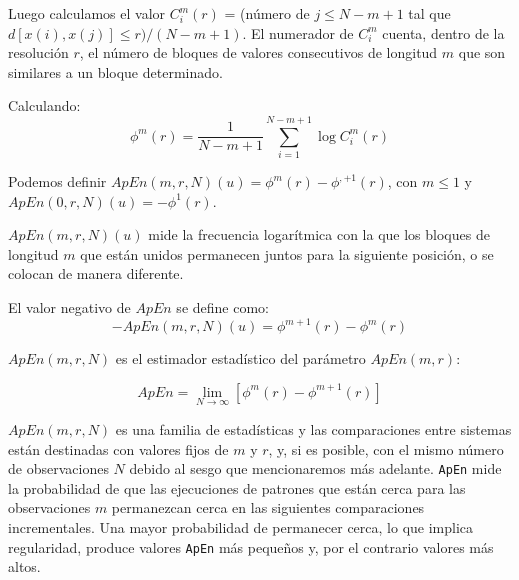 \documentclass[a4paper,12pt]{article}
\begin{document}
Luego calculamos el valor $C_i^m (r)$ = (número de $j \leq N - m + 1$ tal que $d[x(i), x(j)] \leq r)/(N - m + 1)$. El numerador de $C_i^m$ cuenta, dentro de la resolución $r$, el número de bloques de valores consecutivos de longitud $m$ que son similares a un bloque determinado. 

Calculando: 
$$\phi^m(r) = \frac{1}{N-m+1} \sum_{i=1}^{N-m+1} \log C_i^m(r)$$

Podemos definir $ApEn(m, r, N )(u) = \phi^m(r) - \phi^{,+1}(r)$, con $m \leq 1$ y $ApEn(0, r, N )(u) = −\phi^1 (r)$. 

$ApEn(m, r, N )(u)$ mide la frecuencia logarítmica con la que los bloques de longitud $m$ que están unidos permanecen juntos para la siguiente posición, o se colocan de manera diferente.

El valor negativo de $ApEn$ se define como:
$$-ApEn(m, r, N )(u) = \phi^{m+1}(r) - \phi^m(r)$$

$ApEn(m,r,N)$ es el estimador estadístico del parámetro $ApEn(m,r)$:

$$ApEn = \lim_{N\to\infty} [\phi^m(r)-\phi^{m+1}(r)]$$

$ApEn(m, r, N)$ es una familia de estadísticas y las comparaciones entre sistemas están destinadas con valores fijos de $m$ y $r$, y, si es posible, con el mismo número de observaciones $N$ debido al sesgo que mencionaremos más adelante. \texttt{ApEn} mide la probabilidad de que las ejecuciones de patrones que están cerca para las observaciones $m$ permanezcan cerca en las siguientes comparaciones incrementales. Una mayor probabilidad de permanecer cerca, lo que implica regularidad, produce valores \texttt{ApEn} más pequeños y, por el contrario valores más altos.
\end{document}
